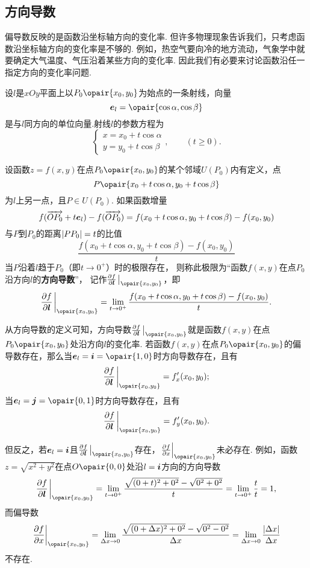 \subsection{方向导数}
偏导数反映的是函数沿坐标轴方向的变化率.
但许多物理现象告诉我们，只考虑函数沿坐标轴方向的变化率是不够的.
例如，热空气要向冷的地方流动，气象学中就要确定大气温度、气压沿着某些方向的变化率.
因此我们有必要来讨论函数沿任一指定方向的变化率问题.

\begin{definition}
设\(l\)是\(xOy\)平面上以\(P_0\opair{x_0,y_0}\)为始点的一条射线，向量\[
\mat{e}_l=\opair{\cos\alpha,\cos\beta}
\]是与\(l\)同方向的单位向量.射线\(l\)的参数方程为\[
\left\{ \begin{array}{l}
x=x_0+t\cos\alpha \\
y=y_0+t\cos\beta
\end{array} \right., \qquad (t \geqslant 0).
\]

设函数\(z=f(x,y)\)在点\(P_0\opair{x_0,y_0}\)的某个邻域\(U(P_0)\)内有定义，点\[
P\opair{x_0+t\cos\alpha,y_0+t\cos\beta}
\]为\(l\)上另一点，且\(P \in U(P_0)\).
如果函数增量\[
f(\overrightarrow{O P_0} + t \boldsymbol{e}_l) - f(\overrightarrow{O P_0})
= f(x_0+t\cos\alpha,y_0+t\cos\beta)-f(x_0,y_0)
\]与\(P\)到\(P_0\)的距离\(\abs{PP_0}=t\)的比值\[
\frac{f(x_0+t\cos\alpha,y_0+t\cos\beta)-f(x_0,y_0)}{t}
\]当\(P\)沿着\(l\)趋于\(P_0\)（即\(t\to0^+\)）时的极限存在，
则称此极限为“函数\(f(x,y)\)在点\(P_0\)沿方向\(l\)的\textbf{方向导数}”，
记作\(\pdv{f}{\mat{l}}\eval_{\opair{x_0,y_0}}\)，即\[
\pdv{f}{\mat{l}}\eval_{\opair{x_0,y_0}}
=\lim\limits_{t\to0^+} \frac{f(x_0+t\cos\alpha,y_0+t\cos\beta)-f(x_0,y_0)}{t}.
\]
\end{definition}

从方向导数的定义可知，方向导数\(\pdv{f}{\mat{l}}\eval_{\opair{x_0,y_0}}\)就是函数\(f(x,y)\)在点\(P_0\opair{x_0,y_0}\)处沿方向\(l\)的变化率.
若函数\(f(x,y)\)在点\(P_0\opair{x_0,y_0}\)的偏导数存在，那么当\(\mat{e}_l = \mat{i} = \opair{1,0}\)时方向导数存在，且有\[
\pdv{f}{\mat{l}}\eval_{\opair{x_0,y_0}} = f'_x(x_0,y_0);
\]当\(\mat{e}_l = \mat{j} = \opair{0,1}\)时方向导数存在，且有\[
\pdv{f}{\mat{l}}\eval_{\opair{x_0,y_0}} = f'_y(x_0,y_0).
\]

但反之，若\(\boldsymbol{e}_l = \boldsymbol{i}\)且\(\pdv{f}{\mat{l}}\eval_{\opair{x_0,y_0}}\)存在，\(\eval{\pdv{f}{x}}_{\opair{x_0,y_0}}\)未必存在.
例如，函数\(z = \sqrt{x^2+y^2}\)在点\(O\opair{0,0}\)处沿\(l = \boldsymbol{i}\)方向的方向导数\[
\pdv{f}{\mat{l}}\eval_{\opair{x_0,y_0}}
= \lim\limits_{t\to0^+} \frac{\sqrt{(0+t)^2+0^2}-\sqrt{0^2+0^2}}{t}
= \lim\limits_{t\to0^+} \frac{t}{t} = 1,
\]而偏导数\[
\eval{\pdv{f}{x}}_{\opair{x_0,y_0}}
= \lim\limits_{\increment x\to0} \frac{\sqrt{(0+\increment x)^2+0^2}-\sqrt{0^2-0^2}}{\increment x}
= \lim\limits_{\increment x\to0} \frac{\abs{\increment x}}{\increment x}
\]不存在.

